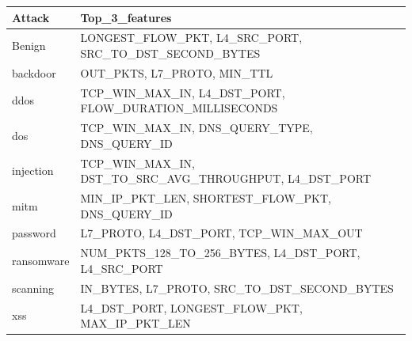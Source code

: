 \begin{tabular}{ll}
\toprule
Attack & Top_3_features \\
\midrule
Benign & LONGEST_FLOW_PKT, L4_SRC_PORT, SRC_TO_DST_SECOND_BYTES \\
backdoor & OUT_PKTS, L7_PROTO, MIN_TTL \\
ddos & TCP_WIN_MAX_IN, L4_DST_PORT, FLOW_DURATION_MILLISECONDS \\
dos & TCP_WIN_MAX_IN, DNS_QUERY_TYPE, DNS_QUERY_ID \\
injection & TCP_WIN_MAX_IN, DST_TO_SRC_AVG_THROUGHPUT, L4_DST_PORT \\
mitm & MIN_IP_PKT_LEN, SHORTEST_FLOW_PKT, DNS_QUERY_ID \\
password & L7_PROTO, L4_DST_PORT, TCP_WIN_MAX_OUT \\
ransomware & NUM_PKTS_128_TO_256_BYTES, L4_DST_PORT, L4_SRC_PORT \\
scanning & IN_BYTES, L7_PROTO, SRC_TO_DST_SECOND_BYTES \\
xss & L4_DST_PORT, LONGEST_FLOW_PKT, MAX_IP_PKT_LEN \\
\bottomrule
\end{tabular}

